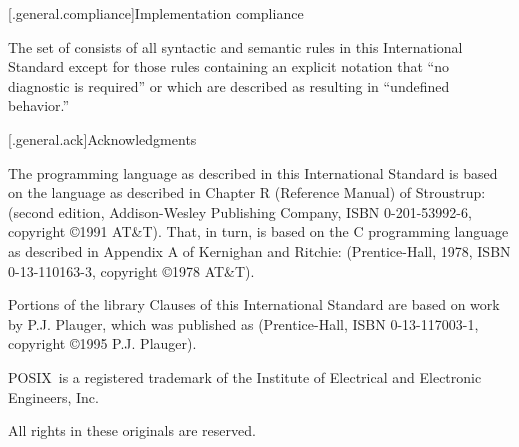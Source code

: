 [\iotwod.general.compliance]{Implementation compliance}

\pnum
{}%
%
The set of
consists of all syntactic and semantic rules in this International
Standard except for those rules containing an explicit notation that
``no diagnostic is required'' or which are described as resulting in
``undefined behavior.''


[\iotwod.general.ack]{Acknowledgments}

\pnum
The \Cpp  programming language as described in this International
Standard is based on the language as described in Chapter R (Reference
Manual) of Stroustrup:  (second
edition, Addison-Wesley Publishing Company, ISBN 0-201-53992-6,
copyright \copyright 1991 AT\&T). That, in turn, is based on the C
programming language as described in Appendix A of Kernighan and
Ritchie:  (Prentice-Hall, 1978, ISBN
0-13-110163-3, copyright \copyright 1978 AT\&T).

\pnum
Portions of the library Clauses of this International Standard are based
on work by P.J. Plauger, which was published as  (Prentice-Hall, ISBN 0-13-117003-1, copyright
\copyright 1995 P.J. Plauger).

\pnum
POSIX\textregistered\ is a registered trademark of the Institute of Electrical and
Electronic Engineers, Inc.

\pnum
All rights in these originals are reserved.
